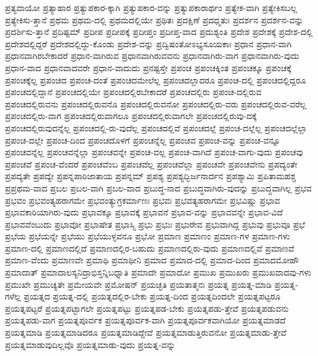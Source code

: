 {ಪ್ರತ್ಯವಾಯೋ
ಪ್ರತ್ಯಾಹಾರ
ಪ್ರತ್ಯುಪಕಾರ-ಕ್ಕಾಗಿ
ಪ್ರತ್ಯುಪಕಾರ-ವನ್ನು
ಪ್ರತ್ಯುಪಕಾರಾರ್ಥಂ
ಪ್ರತ್ಯೇಕ-ವಾಗಿ
ಪ್ರತ್ಯೇಕಿಸಬಲ್ಲ
ಪ್ರತ್ಯೇಕಿಸು-ತ್ತಾನೆ
ಪ್ರಥಮ
ಪ್ರಥಮ-ದಲ್ಲಿ
ಪ್ರಥಮದಲ್ಲಿಯೇ
ಪ್ರಥಿತಃ
ಪ್ರದಕ್ಷಿಣೆ
ಪ್ರದಧ್ಮತುಃ
ಪ್ರದರ್ಶನ
ಪ್ರದರ್ಶನ-ವನ್ನು
ಪ್ರದರ್ಶಿಸು-ತ್ತಾನೆ
ಪ್ರದಿಷ್ಟಮ್
ಪ್ರದೀಪ
ಪ್ರದೀಪಕ್ಕೆ
ಪ್ರದೀಪ್ತಂ
ಪ್ರದೀಪ್ತ-ವಾದ
ಪ್ರದುಶ್ಯಂತಿ
ಪ್ರದೇಶ
ಪ್ರದೇಶಕ್ಕೆ
ಪ್ರದೇಶ-ದಲ್ಲಿ
ಪ್ರದೇಶದಲ್ಲಿದ್ದರೆ
ಪ್ರದೇಶದಲ್ಲಿದ್ದು-ಕೊಂಡು
ಪ್ರದೇಶ-ವನ್ನು
ಪ್ರದ್ವಿಷಂತೋಽಭ್ಯಸೂಯಕಾಃ
ಪ್ರಧಾನ
ಪ್ರಧಾನ-ವಾಗಿ
ಪ್ರಧಾನವಾಗಿರಬೇಕಾದರೆ
ಪ್ರಧಾನ-ವಾಗಿರುವ
ಪ್ರಧಾನವಾಗಿರುವವನು
ಪ್ರಧಾನವಾಗಿರು-ವಾಗ
ಪ್ರಧಾನವಾಗಿರು-ವುದು
ಪ್ರಧಾನ-ವಾದ
ಪ್ರಧಾನವಾದವರೇ
ಪ್ರಧಾನ-ವಾದುದು
ಪ್ರನಷ್ಟಸ್ತೇ
ಪ್ರಪಂಚ
ಪ್ರಪಂಚಕ್ಕಿಂತ
ಪ್ರಪಂಚಕ್ಕೂ
ಪ್ರಪಂಚಕ್ಕೆ
ಪ್ರಪಂಚಕ್ಕೆಲ್ಲ
ಪ್ರಪಂಚದ
ಪ್ರಪಂಚ-ದಂತೆ
ಪ್ರಪಂಚದಮೇಲೆಲ್ಲ
ಪ್ರಪಂಚದಲ್ಲಾದರೂ
ಪ್ರಪಂಚ-ದಲ್ಲಿ
ಪ್ರಪಂಚದಲ್ಲಿದ್ದರೂ
ಪ್ರಪಂಚದಲ್ಲಿದ್ದಾನೆ
ಪ್ರಪಂಚದಲ್ಲಿಯೇ
ಪ್ರಪಂಚದಲ್ಲಿರಬೇಕಾದರೆ
ಪ್ರಪಂಚದಲ್ಲಿರು
ಪ್ರಪಂಚ-ದಲ್ಲಿರುವ
ಪ್ರಪಂಚದಲ್ಲಿರುವನು
ಪ್ರಪಂಚದಲ್ಲಿರುವನೊ
ಪ್ರಪಂಚದಲ್ಲಿರುವನೋ
ಪ್ರಪಂಚದಲ್ಲಿರು-ವರು
ಪ್ರಪಂಚದಲ್ಲಿರುವ-ವರೆಲ್ಲ
ಪ್ರಪಂಚದಲ್ಲಿರು-ವಾಗ
ಪ್ರಪಂಚದಲ್ಲಿರುವಾಗಲೂ
ಪ್ರಪಂಚದಲ್ಲಿರುವಾಗಲೇ
ಪ್ರಪಂಚದಲ್ಲಿರುವು-ದಕ್ಕೆ
ಪ್ರಪಂಚದಲ್ಲಿರುವುದನ್ನೆಲ್ಲ
ಪ್ರಪಂಚದಲ್ಲಿ-ರು-ವುದೆಲ್ಲ
ಪ್ರಪಂಚದಲ್ಲಿವೆ
ಪ್ರಪಂಚದಲ್ಲೆ
ಪ್ರಪಂಚ-ದಲ್ಲೆಲ್ಲ
ಪ್ರಪಂಚದಲ್ಲೆಲ್ಲಾ
ಪ್ರಪಂಚ-ದಲ್ಲೇ
ಪ್ರಪಂಚ-ದಿಂದ
ಪ್ರಪಂಚದೊಳಗೆ
ಪ್ರಪಂಚನ್ನೆಲ್ಲ
ಪ್ರಪಂಚವ
ಪ್ರಪಂಚ-ವನ್ನು
ಪ್ರಪಂಚ-ವನ್ನೂ
ಪ್ರಪಂಚವನ್ನೆಲ್ಲ
ಪ್ರಪಂಚವನ್ನೆಲ್ಲಾ
ಪ್ರಪಂಚವನ್ನೇ
ಪ್ರಪಂಚ-ವಲ್ಲ
ಪ್ರಪಂಚ-ವಾಗಿದೆ
ಪ್ರಪಂಚ-ವಾಗು-ವುದು
ಪ್ರಪಂಚವು
ಪ್ರಪಂಚವೆ
ಪ್ರಪಂಚ-ವೆಂದರೆ
ಪ್ರಪಂಚವೆಂಬ
ಪ್ರಪಂಚವೆಲ್ಲ
ಪ್ರಪಂಚವೆಲ್ಲಾ
ಪ್ರಪಂಚವೇ
ಪ್ರಪಂಚವೇನು
ಪ್ರಪದ್ಯಂತೇ
ಪ್ರಪದ್ಯತೇ
ಪ್ರಪದ್ಯೇ
ಪ್ರಪನ್ನಪಾರಿಜಾತಾಯ
ಪ್ರಪನ್ನಮ್
ಪ್ರಪಶ್ಯ
ಪ್ರಪಶ್ಯದ್ಭಿರ್ಜನಾರ್ದನ
ಪ್ರಪಶ್ಯಾಮಿ
ಪ್ರಪಿತಾಮಹಶ್ಚ
ಪ್ರಪ್ರಥಮ-ವಾದ
ಪ್ರಬಲ
ಪ್ರಬಲ-ವಾಗಿ
ಪ್ರಬಲ-ವಾದ
ಪ್ರಬುದ್ಧ-ನಾದ
ಪ್ರಬುದ್ಧವಾಗಿರು-ವುದನ್ನು
ಪ್ರಬುದ್ಧವಾಗಿಲ್ಲ
ಪ್ರಭವ
ಪ್ರಭವಂ
ಪ್ರಭವಂತ್ಯಹರಾಗಮೇ
ಪ್ರಭವಂತ್ಯುಗ್ರಕರ್ಮಾಣಃ
ಪ್ರಭವಃ
ಪ್ರಭವತ್ಯಹರಾಗಮೇ
ಪ್ರಭವಿಷ್ಣು
ಪ್ರಭಾವ
ಪ್ರಭಾವಕಾರಿಯಾಗಿರು-ವುದು
ಪ್ರಭಾವಕ್ಕೂ
ಪ್ರಭಾವಕ್ಕೆ
ಪ್ರಭಾವನೆ
ಪ್ರಭಾವ-ವನ್ನು
ಪ್ರಭಾವವನ್ನೇ
ಪ್ರಭಾವ-ವಿದೆ
ಪ್ರಭಾವವೆಂಬುದು
ಪ್ರಭಾವೋ
ಪ್ರಭಾಷೇತ
ಪ್ರಭಾಸ್ಮಿ
ಪ್ರಭು
ಪ್ರಭುಃ
ಪ್ರಭುರೇವ
ಪ್ರಭುವಾಗಿದ್ದ
ಪ್ರಭುವು
ಪ್ರಭುವೂ
ಪ್ರಭೆ
ಪ್ರಭೆಯ
ಪ್ರಭೆಯನ್ನೇ
ಪ್ರಭೆಯು
ಪ್ರಭೆಯುಳ್ಳವನೂ
ಪ್ರಭೋ
ಪ್ರಮಾಣ
ಪ್ರಮಾಣಂ
ಪ್ರಮಾಣ-ಗಳ
ಪ್ರಮಾಣ-ಗಳು
ಪ್ರಮಾಣ-ದಲ್ಲಿ
ಪ್ರಮಾಣದಲ್ಲಿದೆ
ಪ್ರಮಾಣದಲ್ಲಿರ-ಬಹುದು
ಪ್ರಮಾಣದಲ್ಲಿರು-ವುದು
ಪ್ರಮಾಣದಲ್ಲಿವೆ
ಪ್ರಮಾಣವೆ
ಪ್ರಮಾಣ-ವೆಂದು
ಪ್ರಮಾಣವೇ
ಪ್ರಮಾಥಿ
ಪ್ರಮಾಥೀನಿ
ಪ್ರಮಾದ
ಪ್ರಮಾದ-ದಲ್ಲಿ
ಪ್ರಮಾದ-ದಿಂದ
ಪ್ರಮಾದಮೋಹೌ
ಪ್ರಮಾದಾತ್
ಪ್ರಮಾದಾಲಸ್ಯನಿದ್ರಾಭಿಸ್ತನ್ನಿಬಧ್ನಾತಿ
ಪ್ರಮಾದೇ
ಪ್ರಮಾದೋ
ಪ್ರಮುಖ
ಪ್ರಮುಖರು
ಪ್ರಮುಖವಾದವು-ಗಳು
ಪ್ರಮುಖೇ
ಪ್ರಮುಚ್ಯತೇ
ಪ್ರಮೇಯವೇ
ಪ್ರಮೋಷನ್
ಪ್ರಯಚ್ಛತಿ
ಪ್ರಯತಾತ್ಮನಃ
ಪ್ರಯತ್ನ
ಪ್ರಯತ್ನ-ಮಾಡಿ
ಪ್ರಯತ್ನ-ಗಳೆಲ್ಲ
ಪ್ರಯತ್ನದ
ಪ್ರಯತ್ನ-ದಲ್ಲಿ
ಪ್ರಯತ್ನದಲ್ಲಿರ-ಬೇಕು
ಪ್ರಯತ್ನ-ದಿಂದ
ಪ್ರಯತ್ನದಿಂದಲೇ
ಪ್ರಯತ್ನಪಟ್ಟರೂ
ಪ್ರಯತ್ನಪಟ್ಟರೆ
ಪ್ರಯತ್ನಪಟ್ಟಾಗಲೇ
ಪ್ರಯತ್ನಪಟ್ಟು
ಪ್ರಯತ್ನಪಡ-ಬೇಕು
ಪ್ರಯತ್ನಪಡು-ತ್ತೇವೆ
ಪ್ರಯತ್ನಪಡುವನು
ಪ್ರಯತ್ನಪಡು-ವಾಗ
ಪ್ರಯತ್ನಪೂರ್ವಕ
ಪ್ರಯತ್ನಪೂರ್ವಕ-ವಾಗಿ
ಪ್ರಯತ್ನಪೂರ್ವಕವಾಗಿಯೋ
ಪ್ರಯತ್ನಮಾಡದೆ
ಪ್ರಯತ್ನಮಾಡಿ
ಪ್ರಯತ್ನಮಾಡಿದರೂ
ಪ್ರಯತ್ನಮಾಡಿದ್ದೇವೆ
ಪ್ರಯತ್ನಮಾಡುತ್ತಿರುವನೋ
ಪ್ರಯತ್ನಮಾಡು-ತ್ತೇವೆ
ಪ್ರಯತ್ನಮಾಡುವುದಿಲ್ಲವೊ
ಪ್ರಯತ್ನಮಾಡು-ವುದು
ಪ್ರಯತ್ನ-ವನ್ನು
}
